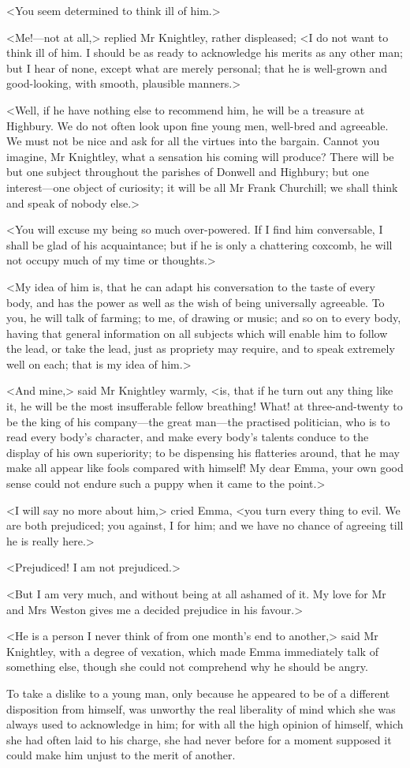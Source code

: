 <You seem determined to think ill of him.>

<Me!—not at all,> replied Mr Knightley, rather displeased; <I do not want to think ill of him. I should be as ready to acknowledge his merits as any other man; but I hear of none, except what are merely personal; that he is well-grown and good-looking, with smooth, plausible manners.>

<Well, if he have nothing else to recommend him, he will be a treasure at Highbury. We do not often look upon fine young men, well-bred and agreeable. We must not be nice and ask for all the virtues into the bargain. Cannot you imagine, Mr Knightley, what a sensation his coming will produce? There will be but one subject throughout the parishes of Donwell and Highbury; but one interest—one object of curiosity; it will be all Mr Frank Churchill; we shall think and speak of nobody else.>

<You will excuse my being so much over-powered. If I find him conversable, I shall be glad of his acquaintance; but if he is only a chattering coxcomb, he will not occupy much of my time or thoughts.>

<My idea of him is, that he can adapt his conversation to the taste of every body, and has the power as well as the wish of being universally agreeable. To you, he will talk of farming; to me, of drawing or music; and so on to every body, having that general information on all subjects which will enable him to follow the lead, or take the lead, just as propriety may require, and to speak extremely well on each; that is my idea of him.>

<And mine,> said Mr Knightley warmly, <is, that if he turn out any thing like it, he will be the most insufferable fellow breathing! What! at three-and-twenty to be the king of his company—the great man—the practised politician, who is to read every body's character, and make every body's talents conduce to the display of his own superiority; to be dispensing his flatteries around, that he may make all appear like fools compared with himself! My dear Emma, your own good sense could not endure such a puppy when it came to the point.>

<I will say no more about him,> cried Emma, <you turn every thing to evil. We are both prejudiced; you against, I for him; and we have no chance of agreeing till he is really here.>

<Prejudiced! I am not prejudiced.>

<But I am very much, and without being at all ashamed of it. My love for Mr and Mrs Weston gives me a decided prejudice in his favour.>

<He is a person I never think of from one month's end to another,> said Mr Knightley, with a degree of vexation, which made Emma immediately talk of something else, though she could not comprehend why he should be angry.

To take a dislike to a young man, only because he appeared to be of a different disposition from himself, was unworthy the real liberality of mind which she was always used to acknowledge in him; for with all the high opinion of himself, which she had often laid to his charge, she had never before for a moment supposed it could make him unjust to the merit of another.